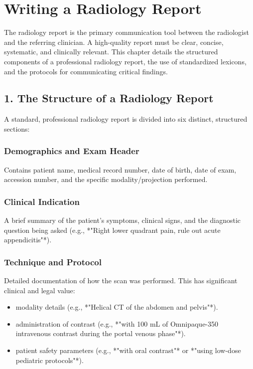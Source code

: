 \chapter{Writing a Radiology Report}

\label{ch:write_report}

The radiology report is the primary communication tool between the radiologist and the referring clinician. A high-quality report must be clear, concise, systematic, and clinically relevant. This chapter details the structured components of a professional radiology report, the use of standardized lexicons, and the protocols for communicating critical findings.


\section*{1. The Structure of a Radiology Report}
A standard, professional radiology report is divided into six distinct, structured sections:

\subsection*{Demographics and Exam Header}
Contains patient name, medical record number, date of birth, date of exam, accession number, and the specific modality/projection performed.

\subsection*{Clinical Indication}
A brief summary of the patient's symptoms, clinical signs, and the diagnostic question being asked (e.g., *"Right lower quadrant pain, rule out acute appendicitis"*). 

\subsection*{Technique and Protocol}
Detailed documentation of how the scan was performed. This has significant clinical and legal value:
\begin{itemize}
    \item modality details (e.g., *"Helical CT of the abdomen and pelvis"*).
    \item administration of contrast (e.g., *"with 100 mL of Omnipaque-350 intravenous contrast during the portal venous phase"*).
    \item patient safety parameters (e.g., *"with oral contrast"* or *"using low-dose pediatric protocols"*).
\end{itemize}


